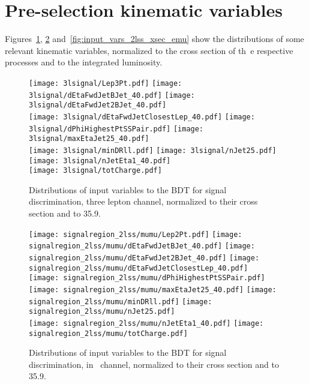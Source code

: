 \section{Pre-selection kinematic variables} \label{app:presel_plots}

Figures~\ref{fig:input_vars_3l_xsec}, \ref{fig:input_vars_2lss_xsec_mumu} and~\ref{fig:input_vars_2lss_xsec_emu} show the distributions of some relevant kinematic variables, normalized to the cross section of th\
e respective processes and to the integrated luminosity.
\newpage
\begin{figure} [!h]
  \centering
  \texttt{[image: 3lsignal/Lep3Pt.pdf]}
  \texttt{[image: 3lsignal/dEtaFwdJetBJet\_40.pdf]}
  \texttt{[image: 3lsignal/dEtaFwdJet2BJet\_40.pdf]}\\
  \texttt{[image: 3lsignal/dEtaFwdJetClosestLep\_40.pdf]}
  \texttt{[image: 3lsignal/dPhiHighestPtSSPair.pdf]}
  \texttt{[image: 3lsignal/maxEtaJet25\_40.pdf]}\\
  \texttt{[image: 3lsignal/minDRll.pdf]}
  \texttt{[image: 3lsignal/nJet25.pdf]}
  \texttt{[image: 3lsignal/nJetEta1\_40.pdf]}\\
  \texttt{[image: 3lsignal/totCharge.pdf]}
  \caption{Distributions of input variables to the BDT for signal discrimination, three lepton channel, normalized to their cross section and to 35.9\fbinv.}
  \label{fig:input_vars_3l_xsec}
\end{figure}

\begin{figure} [!h]
  \centering
  \texttt{[image: signalregion\_2lss/mumu/Lep2Pt.pdf]}
  \texttt{[image: signalregion\_2lss/mumu/dEtaFwdJetBJet\_40.pdf]}
  \texttt{[image: signalregion\_2lss/mumu/dEtaFwdJet2BJet\_40.pdf]}
  \texttt{[image: signalregion\_2lss/mumu/dEtaFwdJetClosestLep\_40.pdf]} \\
  \texttt{[image: signalregion\_2lss/mumu/dPhiHighestPtSSPair.pdf]}
  \texttt{[image: signalregion\_2lss/mumu/maxEtaJet25\_40.pdf]}
  \texttt{[image: signalregion\_2lss/mumu/minDRll.pdf]}
  \texttt{[image: signalregion\_2lss/mumu/nJet25.pdf]} \\
  \texttt{[image: signalregion\_2lss/mumu/nJetEta1\_40.pdf]}
  \texttt{[image: signalregion\_2lss/mumu/totCharge.pdf]}
  \caption{Distributions of input variables to the BDT for signal discrimination, in \mumu\ channel, normalized to their cross section and to 35.9\fbinv.}
  \label{fig:input_vars_2lss_xsec_mumu}
\end{figure}

